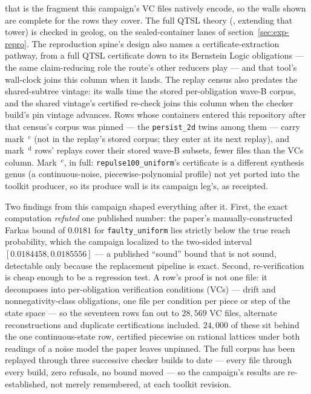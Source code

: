 that is the fragment this campaign's VC files natively encode, so
the walls shown are complete for the rows they cover. The full QTSL
theory (, extending that tower) is checked
in geolog, on the sealed-container lanes of
section~\ref{sec:exp-repro}. The reproduction spine's design also
names a certificate-extraction pathway, from a full QTSL certificate
down to its Bernstein Logic obligations --- the same claim-reducing
role the route's other reducers play --- and that tool's wall-clock
joins this column when it lands. The replay census also predates the
shared-subtree vintage: its walls time the stored per-obligation
wave-B corpus, and the shared vintage's certified re-check joins
this column when the checker build's pin vintage advances. Rows whose
containers entered this repository after that census's corpus was
pinned --- the \texttt{persist\_2d} twins among them --- carry
mark~$^{\text{c}}$ (not in the replay's stored corpus; they enter at
its next replay), and mark~$^{\text{d}}$ rows' replays cover their
stored wave-B subsets, fewer files than the VCs column.
Mark~$^{\text{e}}$, in full: \texttt{repulse100\_uniform}'s certificate
is a different synthesis genus (a continuous-noise,
piecewise-polynomial profile) not yet ported into the toolkit producer,
so its produce wall is its campaign leg's, as receipted.

Two findings from this campaign shaped everything after it. First, the
exact computation \emph{refuted} one published number: the paper's
manually-constructed Farkas bound of $0.0181$ for
\texttt{faulty\_uniform} lies strictly below the true reach probability,
which the campaign localized to the two-sided interval
$[0.0184458, 0.0185556]$ --- a published ``sound'' bound that is not
sound, detectable only because the replacement pipeline is exact.
Second, re-verification is cheap enough to be a regression test. A
row's proof is not one file: it decomposes into per-obligation
verification conditions (VCs) --- drift and nonnegativity-class
obligations, one file
per condition per piece or step of the state space --- so the
seventeen rows fan out to $28{,}569$ VC files, alternate
reconstructions and duplicate certifications included. $24{,}000$ of
these sit behind the one continuous-state row, certified piecewise on
rational lattices under both readings of a noise model the paper
leaves unpinned. The full corpus has been replayed through three
successive checker builds to date --- every file through every build,
zero refusals, no bound moved --- so the campaign's results are
re-established, not merely remembered, at each toolkit revision.

